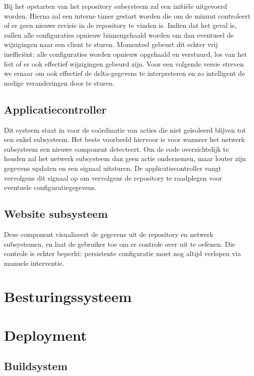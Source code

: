 Bij het opstarten van het repository subsysteem zal een initiële  uitgevoerd worden. Hierna zal een interne timer gestart worden die om de minuut controleert of er geen nieuwe revisie in de repository te vinden is. Indien dat het geval is, zullen alle configuraties opnieuw binnengehaald worden om dan eventueel de wijzigingen naar een client te sturen. Momenteel gebeurt dit echter vrij inefficiënt: alle configuraties worden opnieuw opgehaald en verstuurd, los van het feit of er ook effectief wijzigingen gebeurd zijn. Voor een volgende versie streven we ernaar om ook effectief de delta-gegevens te interpreteren en zo intelligent de nodige veranderingen door te sturen.

\section{Applicatiecontroller}

Dit systeem staat in voor de coördinatie van acties die niet geïsoleerd blijven tot een enkel subsysteem. Het beste voorbeeld hiervoor is voor wanneer het netwerk subsysteem een nieuwe component detecteert. Om de code overzichtelijk te houden zal het netwerk subsysteem dan geen actie ondernemen, maar louter zijn gegevens updaten en een signaal uitsturen. De applicatiecontroller vangt vervolgens dit signaal op om vervolgens de repository te raadplegen voor eventuele configuratiegegevens.

\section{Website subsysteem}

Deze component visualiseert de gegevens uit de repository en netwerk subsystemen, en laat de gebruiker toe om er controle over uit te oefenen. Die controle is echter beperkt: persistente configuratie moet nog altijd verlopen via manuele interventie.

\chapter{Besturingssysteem}

\chapter{Deployment}

\section{Buildsystem}

